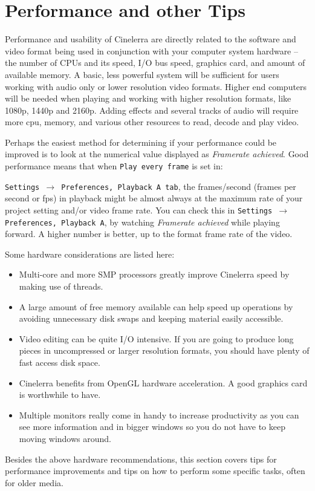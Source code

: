 \chapter{Performance and other Tips}%
\label{cha:performance_tips}

Performance and usability of Cinelerra are directly related to the software and video format being used in conjunction with your computer system hardware -- the number of CPUs and its speed, I/O bus speed, graphics card, and amount of available memory. A basic, less powerful system will be sufficient for users working with audio only or lower resolution video formats.  Higher end computers will be needed when playing and working with higher resolution formats, like 1080p, 1440p and 2160p. Adding effects and several tracks of audio will require more cpu, memory, and various other resources to read, decode and play video. 

Perhaps the easiest method for determining if your performance could be improved is to look at the numerical value displayed as \textit{Framerate achieved}.  Good performance means that when \texttt{Play every frame} is set in:

\texttt{Settings $\rightarrow$ Preferences, Playback A tab}, the frames/second (frames per second or fps) in playback might be almost always at the maximum rate of your project setting and/or video frame rate. You can check this in \texttt{Settings $\rightarrow$ Preferences, Playback A}, by watching \textit{Framerate achieved} while playing forward.  A higher number is better, up to the format frame rate of the video.

Some hardware considerations are listed here:
\begin{itemize}
	\item Multi-core and more SMP processors greatly improve Cinelerra speed by making use of threads.
	\item A large amount of free memory available can help speed up operations by avoiding unnecessary disk
	swaps and keeping material easily accessible.
	\item Video editing can be quite I/O intensive. If you are going to produce long pieces in uncompressed or
	larger resolution formats, you should have plenty of fast access disk space.
	\item Cinelerra benefits from OpenGL hardware acceleration. A good graphics card is worthwhile to have.
	\item Multiple monitors really come in handy to increase productivity as you can see more information and
	in bigger windows so you do not have to keep moving windows around.
\end{itemize}
Besides the above hardware recommendations, this section covers tips for performance improvements and tips on how to perform some specific tasks, often for older media.

